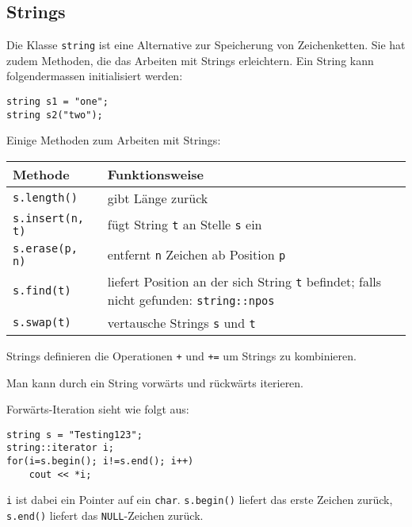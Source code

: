 \documentclass{article}
\newenvironment{code}
	{\begin{shaded}\vspace{-2.2mm}} 
	{\vspace{-5.0mm}\end{shaded}}
\begin{document}
\begin{multicols*}{3}
		\subsection{Strings} %
			Die Klasse \lstinline!string! ist eine Alternative zur Speicherung von Zeichenketten. Sie hat zudem Methoden, die das Arbeiten mit Strings erleichtern. Ein String kann folgendermassen initialisiert werden:
			\begin{code}
				\begin{lstlisting}[style=list]
string s1 = "one";
string s2("two");
				\end{lstlisting}
			\end{code}
			
			Einige Methoden zum Arbeiten mit Strings:
			
\begin{tabular}{l|p{4.75cm}}
\hline
Methode & Funktionsweise\\
\hline
\lstinline!s.length()! & gibt Länge zurück\\
\lstinline!s.insert(n, t)! & fügt String \lstinline!t! an Stelle \lstinline!s! ein\\
\lstinline!s.erase(p, n)! & entfernt \lstinline!n! Zeichen ab Position \lstinline!p!\\
\lstinline!s.find(t)! & liefert Position an der sich String   \lstinline!t! befindet; falls nicht gefunden: \lstinline!string::npos!\\
\lstinline!s.swap(t)! & vertausche Strings \lstinline!s! und \lstinline!t!\\
\hline
\end{tabular}
			
			Strings definieren die Operationen \lstinline!+! und \lstinline!+=! um Strings zu kombinieren.
			
			Man kann durch ein String vorwärts und rückwärts iterieren.
			
			Forwärts-Iteration sieht wie folgt aus:
			\begin{code}
				\begin{lstlisting}[style=list]
string s = "Testing123";
string::iterator i;
for(i=s.begin(); i!=s.end(); i++)
	cout << *i;
				\end{lstlisting}
			\end{code}
			
			\lstinline!i! ist dabei ein Pointer auf ein \lstinline!char!. \lstinline!s.begin()! liefert das erste Zeichen zurück, \lstinline!s.end()! liefert das \lstinline!NULL!-Zeichen zurück.
			

\end{multicols*}
\end{document}
